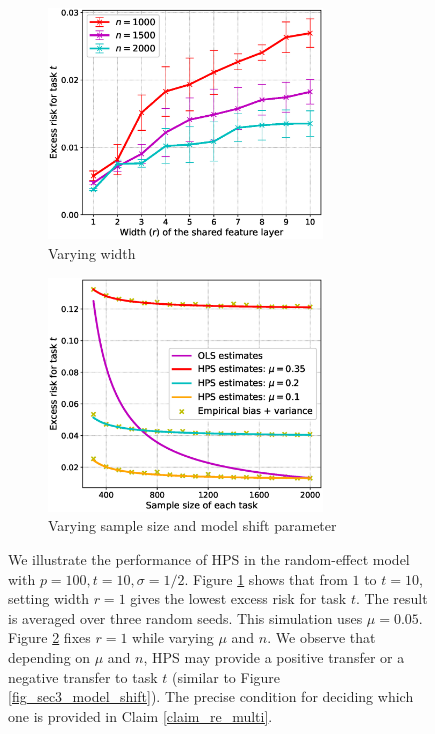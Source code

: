 \begin{figure}[!t]
	\begin{subfigure}[b]{0.5\textwidth}
		\centering
		\includegraphics[width=0.8\textwidth]{figures/multitask_width.eps}
		\caption{Varying width}
		\label{fig_sec4_width}
	\end{subfigure}
	\begin{subfigure}[b]{0.5\textwidth}
		\centering
		\includegraphics[width=0.8\textwidth]{figures/multitask_transfer.eps}
		\caption{Varying sample size and model shift parameter}
		\label{fig_sec4_transfer}
	\end{subfigure}
	\caption{We illustrate the performance of HPS in the random-effect model with $p = 100, t = 10, \sigma = 1/2$.
	Figure \ref{fig_sec4_width} shows that from $1$ to $t = 10$, setting width $r = 1$ gives the lowest excess risk for task $t$.
	The result is averaged over three random seeds.
	This simulation uses $\mu = 0.05$.
	Figure \ref{fig_sec4_transfer} fixes $r = 1$ while varying $\mu$ and $n$. We observe that depending on $\mu$ and $n$, HPS may provide a positive transfer or a negative transfer to task $t$ (similar to Figure \ref{fig_sec3_model_shift}). The precise condition for deciding which one is provided in Claim \ref{claim_re_multi}.}
	\label{fig_sec4}
\end{figure}

